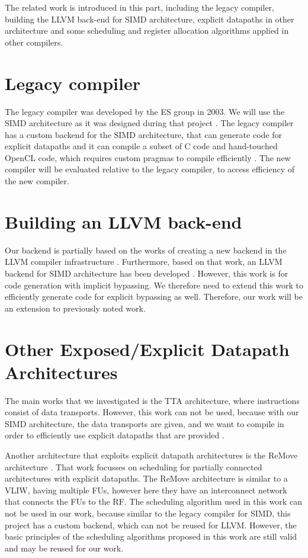 The related work is introduced in this part, including the legacy compiler, building the LLVM back-end for SIMD architecture, explicit datapaths in other architecture and some scheduling and register allocation algorithms applied in other compilers.

\section{Legacy compiler}
The legacy compiler was developed by the ES group in 2003. We will use the SIMD architecture as it was designed during that project \cite{simd}. The legacy compiler has a custom backend for the SIMD architecture, that can generate code for explicit datapaths \cite{dongrio1} and it can compile a subset of C code and hand-touched OpenCL code, which requires custom pragmas to compile efficiently \cite{dongrio2}. The new compiler will be evaluated relative to the legacy compiler, to access efficiency of the new compiler.

\section{Building an LLVM back-end}
Our backend is partially based on the works of creating a new backend in the LLVM compiler infrastructure \cite{tricore}. Furthermore, based on that work, an LLVM backend for SIMD architecture has been developed \cite{liu_zhenyuan}. However, this work is for code generation with implicit bypassing. We therefore need to extend this work to efficiently generate code for explicit bypassing as well. Therefore, our work will be an extension to previously noted work.

\section{Other Exposed/Explicit Datapath Architectures}
The main works that we investigated is the TTA architecture, where instructions consist of data transports. However, this work can not be used, because with our SIMD architecture, the data transports are given, and we want to compile in order to efficiently use explicit datapaths that are provided \cite{tta, tta_codegen}.

Another architecture that exploits explicit datapath architectures is the ReMove architecture \cite{remove}. That work focusses on scheduling for partially connected architectures with explicit datapaths. The ReMove architecture is similar to a VLIW, having multiple FUs, however here they have an interconnect network that connects the FUs to the RF. The scheduling algorithm used in this work can not be used in our work, because similar to the legacy compiler for SIMD, this project has a custom backend, which can not be reused for LLVM. However, the basic principles of the scheduling algorithms proposed in this work are still valid and may be reused for our work.

